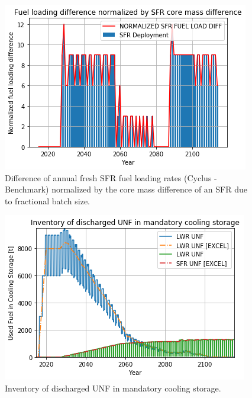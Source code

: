 \begin{frame}

\begin{figure}[htbp!]
    \begin{center}
        \includegraphics[scale=0.5]{./images/fuel_load_diff_norm.png}
    \end{center}
        \caption{Difference of annual fresh \gls{SFR} fuel loading rates (Cyclus - Benchmark) normalized by the core mass difference of an \gls{SFR} due to fractional batch size.}
    \label{fig:fuel_load_diff_norm}
\end{figure}

\end{frame}
\begin{frame}
\begin{figure}[htbp!]
    \begin{center}
        \includegraphics[scale=0.5]{./images/fuel_discharge_monthly.png}
    \end{center}
        \caption{Inventory of discharged UNF in mandatory cooling storage.}
    \label{fig:fuel_discharge_monthly}
\end{figure}

\end{frame}
